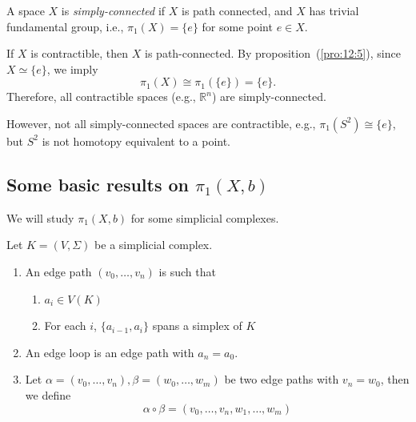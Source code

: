 \begin{definition}
A space $X$ is \emph{simply-connected} if $X$ is path connected, and $X$ has trivial fundamental group, i.e., $\pi_1(X)=\{e\}$ for some point $e\in X$.
\end{definition}

\begin{example}
If $X$ is contractible, then $X$ is path-connected.
By proposition~(\ref{pro:12:5}), since $X\simeq\{e\}$, we imply
\[
\pi_1(X)\cong\pi_1(\{e\})=\{e\}.
\]
Therefore, all contractible spaces (e.g., $\mathbb{R}^n$) are simply-connected.

However, not all simply-connected spaces are contractible, e.g., $\pi_1(S^2)\cong\{e\}$, but $S^2$ is not homotopy equivalent to a point.
\end{example}


\subsection{Some basic results on $\pi_1(X,b)$}



We will study $\pi_1(X,b)$ for some simplicial complexes.
\begin{definition}
Let $K=(V,\Sigma)$ be a simplicial complex.
\begin{enumerate}
\item
An edge path $(v_0,\dots,v_n)$ is such that
\begin{enumerate}
\item
$a_i\in V(K)$
\item
For each $i$, $\{a_{i-1},a_i\}$ spans a simplex of $K$
\end{enumerate}
\item
An edge loop is an edge path with $a_n=a_0$.
\item
Let $\alpha = (v_0,\dots,v_n),\beta = (w_0,\dots,w_m)$ be two edge paths with $v_n=w_0$, then we define 
\[
\alpha\circ\beta =(v_0,\dots,v_n,w_1,\dots,w_m)
\]
\end{enumerate}
\end{definition}




